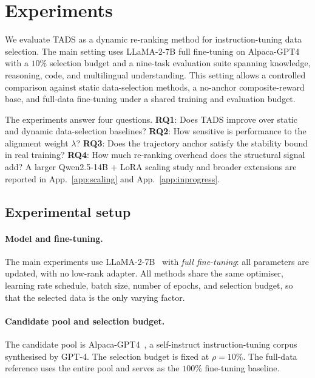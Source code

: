 \section{Experiments}
\label{sec:experiments}

We evaluate \textsc{TADS} as a dynamic re-ranking method for
instruction-tuning data selection. The main setting uses
LLaMA-2-7B full fine-tuning on Alpaca-GPT4 with a $10\%$ selection
budget and a nine-task evaluation suite spanning knowledge,
reasoning, code, and multilingual understanding. This setting
allows a controlled comparison against static data-selection
methods, a no-anchor composite-reward base, and full-data
fine-tuning under a shared training and evaluation budget.

The experiments answer four questions. \textbf{RQ1}: Does
\textsc{TADS} improve over static and dynamic data-selection
baselines? \textbf{RQ2}: How sensitive is performance to the
alignment weight $\lambda$? \textbf{RQ3}: Does the trajectory
anchor satisfy the stability bound in real training? \textbf{RQ4}:
How much re-ranking overhead does the structural signal add? A
larger Qwen2.5-14B + LoRA scaling study and broader extensions are
reported in App.~\ref{app:scaling} and App.~\ref{app:inprogress}.

\subsection{Experimental setup}
\label{sec:setup}

\paragraph{Model and fine-tuning.}
The main experiments use LLaMA-2-7B~\cite{touvron2023llama2} with
\emph{full fine-tuning}: all parameters are updated, with no
low-rank adapter. All methods share the same optimiser, learning
rate schedule, batch size, number of epochs, and selection budget,
so that the selected data is the only varying factor.

\paragraph{Candidate pool and selection budget.}
The candidate pool is Alpaca-GPT4~\cite{alpaca_gpt4}, a
self-instruct instruction-tuning corpus synthesised by GPT-4. The
selection budget is fixed at $\rho=10\%$. The full-data reference
uses the entire pool and serves as the $100\%$ fine-tuning baseline.

